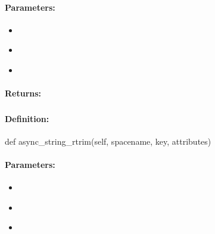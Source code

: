 \paragraph{Parameters:}
\begin{itemize}[noitemsep]
\item {}\\

\item {}\\

\item {}\\

\end{itemize}

\paragraph{Returns:}


\pagebreak
\subsubsection{}
\label{api:python:async_string_rtrim}


\paragraph{Definition:}
\begin{pythoncode}
def async_string_rtrim(self, spacename, key, attributes)
\end{pythoncode}

\paragraph{Parameters:}
\begin{itemize}[noitemsep]
\item {}\\

\item {}\\

\item {}\\

\end{itemize}

